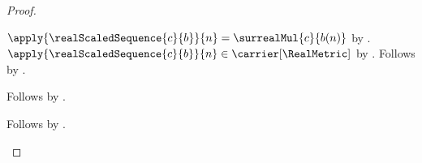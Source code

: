 \begin{proof}
\begin{byCase}
\begin{subproof}
\begin{subproof}
                    $\apply{\realScaledSequence{c}{b}}{n}
                        =\surrealMul{c}{b(n)}$
                        by .
                    $\apply{\realScaledSequence{c}{b}}{n}
                        \in\carrier[\RealMetric]$
                        by .
                    Follows by .
                \end{subproof}
                Follows by \auto.
            \end{subproof}
            Follows by .
    \end{byCase}
\end{proof}
